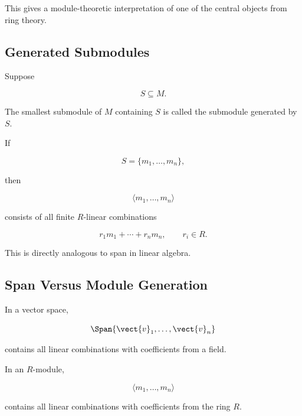 This gives a module-theoretic interpretation of one of the central objects
from ring theory.

\subsection{Generated Submodules}
\label{subsec:generated-submodules}

Suppose

\[ S\subseteq M. \]

The smallest submodule of \(M\) containing \(S\) is called the submodule
generated by \(S\).

If

\[ S=\{m_1,\ldots,m_n\}, \]

then

\[ \langle m_1,\ldots,m_n\rangle \]

consists of all finite \(R\)-linear combinations

\[ r_1m_1+\cdots+r_nm_n,\qquad r_i\in R. \]

This is directly analogous to span in linear algebra.

\subsection{Span Versus Module Generation}
\label{subsec:span-module-generation}

In a vector space,

\[ \Span\{\vect{v}_1,\ldots,\vect{v}_n\} \]

contains all linear combinations with coefficients from a field.

In an \(R\)-module,

\[ \langle m_1,\ldots,m_n\rangle \]

contains all linear combinations with coefficients from the ring \(R\).

\begin{center}
\end{center}

